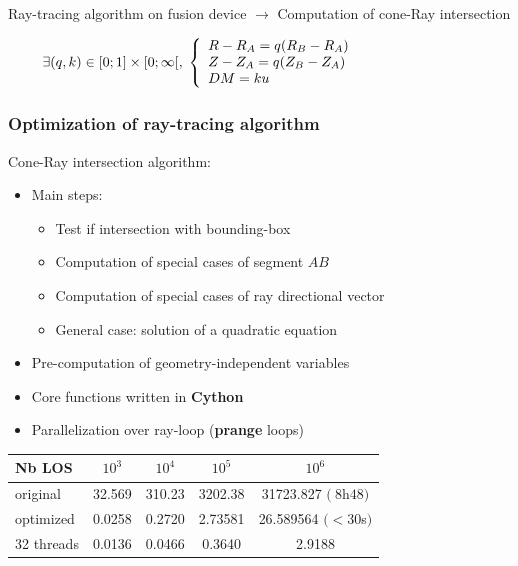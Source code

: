 \documentclass[10pt]{beamer}
\begin{document}
\begin{frame}
\vspace{0.3cm}
\begin{alertblock}{Ray-tracing algorithm on fusion device $\longrightarrow$ Computation of cone-Ray intersection}
\end{alertblock}

$$
\hspace{-3cm}
\exists (q,k) \in [0;1]\times [0;\infty[, \;
\left\{\begin{array}{ll}
R-R_A = q(R_B-R_A)\\
Z-Z_A = q(Z_B-Z_A)\\
DM = k u
\end{array}\right.
$$
	
\end{frame}


\begin{frame}
\frametitle{Optimization of ray-tracing algorithm}


Cone-Ray intersection algorithm:
	\begin{itemize}
	\item Main steps:
	\begin{itemize}
		\item Test if intersection with bounding-box
		\item Computation of special cases of segment $AB$
		\item Computation of special cases of ray directional vector
		\item General case: solution of a quadratic equation
	\end{itemize}
	\item Pre-computation of geometry-independent variables
	\item Core functions written in \textbf{Cython}
	\item Parallelization over ray-loop (\textbf{prange} loops)
	\end{itemize}


\begin{table}[h] %
    \centering
    \label{tab:LOS_init_sirrah}
     \begin{tabular}{@{}l*{4}{S[table-format=1.2e-1,scientific-notation=true]}@{}}
       \toprule
       \textbf{Nb LOS} &  {$10^3$} & {$10^4$} & {$10^5$} & {$10^6$}\\
       \midrule
       original       & 32.569 & 310.23 & 3202.38 & 31723.827 $(~8$h$48)$\\
       optimized   & 0.0258 & 0.2720 & 2.73581 & 26.589564 $(<30$s$)$\\
       32 threads & 0.0136 & 0.0466 & 0.3640 & 2.9188 \\
       \bottomrule
     \end{tabular}
\end{table}

	
\end{frame}
\end{document}
